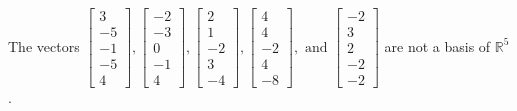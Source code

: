 \begin{exercise}
\begin{exerciseStatement}
  \end{exerciseStatement}
  \begin{exerciseAnswer}
   The vectors \(\left[\begin{array}{r}
3 \\
-5 \\
-1 \\
-5 \\
4
\end{array}\right] , \left[\begin{array}{r}
-2 \\
-3 \\
0 \\
-1 \\
4
\end{array}\right] , \left[\begin{array}{r}
2 \\
1 \\
-2 \\
3 \\
-4
\end{array}\right] , \left[\begin{array}{r}
4 \\
4 \\
-2 \\
4 \\
-8
\end{array}\right] , \text{ and } \left[\begin{array}{r}
-2 \\
3 \\
2 \\
-2 \\
-2
\end{array}\right]\) 
  	 are not  a basis of \(\mathbb{R}^5\).
  


  \end{exerciseAnswer}
\end{exercise}